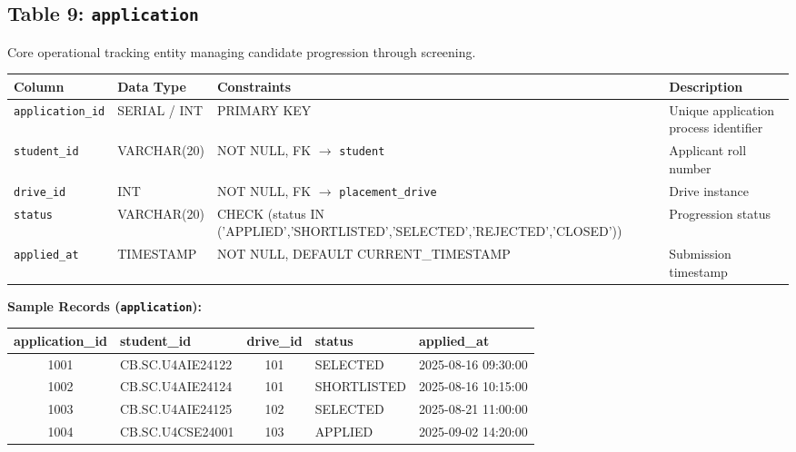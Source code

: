 \documentclass[11pt,a4paper]{article}
\begin{document}
\subsection{Table 9: \texttt{application}}
Core operational tracking entity managing candidate progression through screening.

\begin{table}[H]
    \centering
    \footnotesize
    \begin{tabularx}{\textwidth}{l l l X}
        \toprule
        \textbf{Column} & \textbf{Data Type} & \textbf{Constraints} & \textbf{Description} \\
        \midrule
        \texttt{application\_id} & SERIAL / INT & PRIMARY KEY & Unique application process identifier \\
        \texttt{student\_id} & VARCHAR(20) & NOT NULL, FK \(\to\) \texttt{student} & Applicant roll number \\
        \texttt{drive\_id} & INT & NOT NULL, FK \(\to\) \texttt{placement\_drive} & Drive instance \\
        \texttt{status} & VARCHAR(20) & CHECK (status IN ('APPLIED','SHORTLISTED','SELECTED','REJECTED','CLOSED')) & Progression status \\
        \texttt{applied\_at} & TIMESTAMP & NOT NULL, DEFAULT CURRENT\_TIMESTAMP & Submission timestamp \\
        \bottomrule
    \end{tabularx}
\end{table}

\textbf{Sample Records (\texttt{application}):}
\begin{table}[H]
    \centering
    \scriptsize
    \begin{tabularx}{\textwidth}{c l c l l}
        \toprule
        \textbf{application\_id} & \textbf{student\_id} & \textbf{drive\_id} & \textbf{status} & \textbf{applied\_at} \\
        \midrule
        1001 & CB.SC.U4AIE24122 & 101 & SELECTED & 2025-08-16 09:30:00 \\
        1002 & CB.SC.U4AIE24124 & 101 & SHORTLISTED & 2025-08-16 10:15:00 \\
        1003 & CB.SC.U4AIE24125 & 102 & SELECTED & 2025-08-21 11:00:00 \\
        1004 & CB.SC.U4CSE24001 & 103 & APPLIED & 2025-09-02 14:20:00 \\
        \bottomrule
    \end{tabularx}
\end{table}
\end{document}
